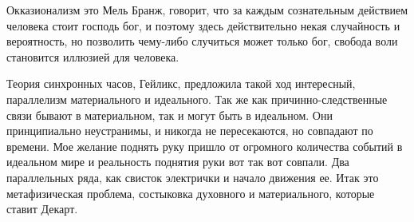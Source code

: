 \documentclass[a4paper, 12pt]{article}
\begin{document}
Окказионализм это Мель Бранж, говорит, что за каждым сознательным 
действием человека стоит господь бог, и поэтому здесь действительно 
некая случайность и вероятность, но позволить чему-либо случиться может 
только бог, свобода воли становится иллюзией для человека.

Теория синхронных часов, Гейликс, предложила такой ход интересный, 
параллелизм материального и идеального. Так же как причинно-следственные 
связи бывают в материальном, так и могут быть в идеальном. Они 
принципиально неустранимы, и никогда не пересекаются, но совпадают по 
времени. Мое желание поднять руку пришло от огромного количества событий 
в идеальном мире и реальность поднятия руки вот так вот совпали. Два 
параллельных ряда, как свисток электрички и начало движения ее. Итак это 
метафизическая проблема, состыковка духовного и материального, которые 
ставит Декарт.
\end{document}
